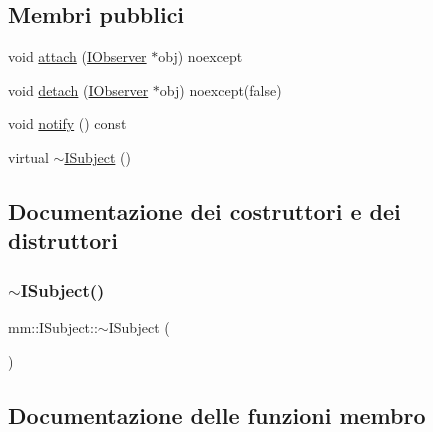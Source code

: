 \subsection*{Membri pubblici}
\begin{DoxyCompactItemize}
\item 
void \hyperlink{classmm_1_1_i_subject_a76069d8db0c9c3d543154b0c2ce23bc9}{attach} (\hyperlink{classmm_1_1_i_observer}{I\+Observer} $\ast$obj) noexcept
\item 
void \hyperlink{classmm_1_1_i_subject_a64be1c0b2ad7ee4631a5270dedb7aa88}{detach} (\hyperlink{classmm_1_1_i_observer}{I\+Observer} $\ast$obj) noexcept(false)
\item 
void \hyperlink{classmm_1_1_i_subject_ad693fe5eb99bc20bc6d70f30bdf1140d}{notify} () const
\item 
virtual \hyperlink{classmm_1_1_i_subject_a37235a8b8ef83116c7351c56e17f7f57}{$\sim$\+I\+Subject} ()
\end{DoxyCompactItemize}


\subsection{Documentazione dei costruttori e dei distruttori}
\mbox{\label{classmm_1_1_i_subject_a37235a8b8ef83116c7351c56e17f7f57}} 
\subsubsection{\texorpdfstring{$\sim$\+I\+Subject()}{~ISubject()}}
{\footnotesize\ttfamily mm\+::\+I\+Subject\+::$\sim$\+I\+Subject (\begin{DoxyParamCaption}{ }\end{DoxyParamCaption})\hspace{0.3cm}{\ttfamily [virtual]}}



\subsection{Documentazione delle funzioni membro}
\mbox{\label{classmm_1_1_i_subject_a76069d8db0c9c3d543154b0c2ce23bc9}} 
